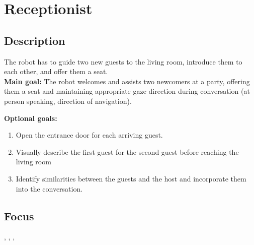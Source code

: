 \section{Receptionist}\label{test:receptionist}

\subsection*{Description}
The robot has to guide two new guests to the living room, introduce them to each other, and offer them a seat.\\
    
\textbf{Main goal:}
    The robot welcomes and assists two newcomers at a party, offering them a seat and maintaining appropriate gaze direction during conversation (at person speaking, direction of navigation).

\textbf{Optional goals:}
\begin{enumerate}[nosep]
	\item Open the entrance door for each arriving guest.
	\item Visually describe the first guest for the second guest before reaching the living room
	\item Identify similarities between the guests and the host and incorporate them into the conversation.
\end{enumerate}

\subsection*{Focus}
\emph{\SysI{}}, \emph{\HRI{}}, \emph{\PerDet{}}, \emph{\PerRec{}}


